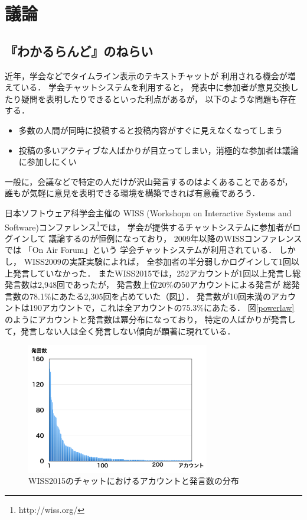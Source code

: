 \section{議論}

\subsection{『わかるらんど』のねらい}
\label{nerai}

近年，学会などでタイムライン表示のテキストチャットが
利用される機会が増えている\cite{goto2012}．
学会チャットシステムを利用すると，
発表中に参加者が意見交換したり疑問を表明したりできるといった利点があるが，
以下のような問題も存在する．

\begin{itemize}
\item 多数の人間が同時に投稿すると投稿内容がすぐに見えなくなってしまう
\item 投稿の多いアクティブな人ばかりが目立ってしまい，消極的な参加者は議論に参加しにくい
\end{itemize}

一般に，会議などで特定の人だけが沢山発言するのはよくあることであるが，
誰もが気軽に意見を表明できる環境を構築できれば有意義であろう．

日本ソフトウェア科学会主催の
WISS (Workshopn on Interactive Systems and Software)コンファレンス\footnote{
  \textsf{http://wiss.org/}
}では，
学会が提供するチャットシステムに参加者がログインして
議論するのが恒例になっており\cite{wiss_challenge}，
2009年以降のWISSコンファレンスでは
「On Air Forum」\cite{nishida2011}という
学会チャットシステムが利用されている．
%
しかし，
WISS2009の実証実験によれば，
全参加者の半分弱しかログインして1回以上発言していなかった．
またWISS2015では，252アカウントが1回以上発言し総発言数は2,948回であったが，
発言数上位20\%の50アカウントによる発言が
総発言数の78.1\%にあたる2,305回を占めていた（図\ref{wisschat}）．
発言数が10回未満のアカウントは190アカウントで，これは全アカウントの75.3\%にあたる．
図\ref{powerlaw}のようにアカウントと発言数は冪分布になっており，
特定の人ばかりが発言して，発言しない人は全く発言しない傾向が顕著に現れている．

\begin{figure}[h]
\centering\includegraphics[width=8cm]{images/wisschat.png}
\caption{WISS2015のチャットにおけるアカウントと発言数の分布}
\label{wisschat}
\end{figure}

